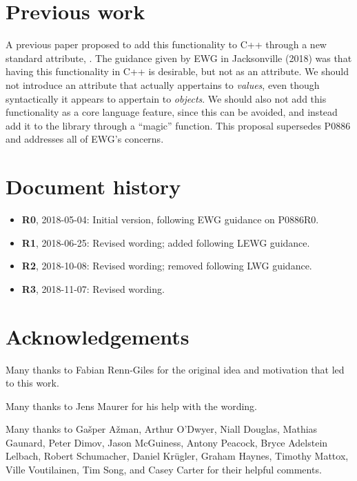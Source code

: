 \section{Previous work}

A previous paper \cite{P0886R0} proposed to add this functionality to C++ through a new standard attribute, . The guidance given by EWG in Jacksonville (2018) was that having this functionality in C++ is desirable, but not as an attribute. We should not introduce an attribute that actually appertains to \emph{values}, even though syntactically it appears to appertain to \emph{objects}. We should also not add this functionality as a core language feature, since this can be avoided, and instead add it to the library through a ``magic'' function. This proposal supersedes P0886 and addresses all of EWG's concerns.

\section{Document history}

\begin{itemize}
\item \textbf{R0}, 2018-05-04: Initial version, following EWG guidance on P0886R0.
\item \textbf{R1}, 2018-06-25: Revised wording; added \tcode{[[nodiscard]]} following LEWG guidance.
\item \textbf{R2}, 2018-10-08: Revised wording; removed  following LWG guidance.
\item \textbf{R3}, 2018-11-07: Revised wording.
\end{itemize}


\section*{Acknowledgements}

Many thanks to Fabian Renn-Giles for the original idea and motivation that led to this work.

Many thanks to Jens Maurer for his help with the wording.

Many thanks to Ga\v sper A\v zman, Arthur O'Dwyer, Niall Douglas, Mathias Gaunard, Peter Dimov, Jason McGuiness, Antony Peacock, Bryce Adelstein Lelbach, Robert Schumacher, Daniel Kr\"ugler, Graham Haynes, Timothy Mattox, Ville Voutilainen, Tim Song, and Casey Carter for their helpful comments.

\renewcommand{\bibname}{References}



